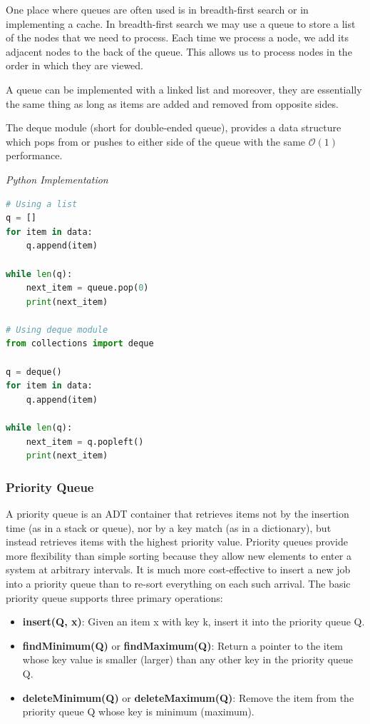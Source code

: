 \documentclass{article}
\newcommand{\bigO}{\mathcal{O}}
\begin{document}
    One place where queues are often used is in breadth-first search or in implementing a cache. In breadth-first search we may use a queue to store a list of the nodes that we need to process. Each time we process a node, we add its adjacent nodes to the back of the queue. This allows us to process nodes in the order in which they are viewed. 
    
    A queue can be implemented with a linked list and moreover, they are essentially the same thing as long as items are added and removed from opposite sides.
    
    The deque module (short for double-ended queue), provides a data structure which pops from or pushes to either side of the queue with the same $\bigO(1)$ performance. 
    
\vspace{8pt} \emph{Python Implementation}
\begin{lstlisting}[language=Python]
# Using a list 
q = []
for item in data:
    q.append(item) 

while len(q):
    next_item = queue.pop(0)
    print(next_item)

# Using deque module 
from collections import deque 

q = deque() 
for item in data:
    q.append(item) 
 
while len(q):
    next_item = q.popleft() 
    print(next_item)

\end{lstlisting}
    
    \subsubsection{Priority Queue}
    A priority queue is an ADT container that retrieves items not by the insertion time (as in a stack or queue), nor by a key match (as in a dictionary), but instead retrieves items with the highest priority value. Priority queues provide more flexibility than simple sorting because they allow new elements to enter a system at arbitrary intervals. It is much more cost-effective to insert a new job into a priority queue than to re-sort everything on each such arrival. The basic priority queue supports three primary operations:
    \begin{itemize}
        \item \textbf{insert(Q, x)}: Given an item x with key k, insert it into the priority queue Q.
        \item \textbf{findMinimum(Q)} or \textbf{findMaximum(Q)}: Return a pointer to the item whose key value is smaller (larger) than any other key in the priority queue Q.
        \item \textbf{deleteMinimum(Q)} or \textbf{deleteMaximum(Q)}: Remove the item from the priority queue Q whose key is minimum (maximum).
    \end{itemize}
\end{document}
